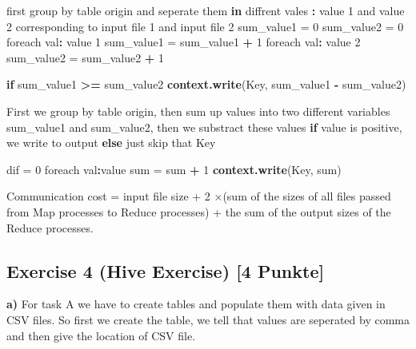 \documentclass[]{article}
\newenvironment{Shaded}{\begin{snugshade}}{\end{snugshade}}
\newcommand{\ControlFlowTok}[1]{\textcolor[rgb]{0.13,0.29,0.53}{\textbf{#1}}}
\newcommand{\DecValTok}[1]{\textcolor[rgb]{0.00,0.00,0.81}{#1}}
\newcommand{\KeywordTok}[1]{\textcolor[rgb]{0.13,0.29,0.53}{\textbf{#1}}}
\newcommand{\NormalTok}[1]{#1}
\newcommand{\OperatorTok}[1]{\textcolor[rgb]{0.81,0.36,0.00}{\textbf{#1}}}
\newcommand{\StringTok}[1]{\textcolor[rgb]{0.31,0.60,0.02}{#1}}
\begin{document}
\begin{Shaded}
\begin{Highlighting}[]
\NormalTok{first group by table origin and seperate them }\ControlFlowTok{in}\NormalTok{ diffrent vales }\OperatorTok{:}\StringTok{ }\NormalTok{value }\DecValTok{1}\NormalTok{ and }
\NormalTok{value }\DecValTok{2}\NormalTok{ corresponding to input file }\DecValTok{1}\NormalTok{ and input file }\DecValTok{2}
\NormalTok{sum_value1 =}\StringTok{ }\DecValTok{0}
\NormalTok{sum_value2 =}\StringTok{ }\DecValTok{0}
\NormalTok{foreach val}\OperatorTok{:}\StringTok{ }\NormalTok{value }\DecValTok{1}
\NormalTok{    sum_value1 =}\StringTok{ }\NormalTok{sum_value1 }\OperatorTok{+}\StringTok{ }\DecValTok{1}
\NormalTok{foreach val}\OperatorTok{:}\StringTok{ }\NormalTok{value }\DecValTok{2}
\NormalTok{    sum_value2 =}\StringTok{ }\NormalTok{sum_value2 }\OperatorTok{+}\StringTok{ }\DecValTok{1}

\ControlFlowTok{if}\NormalTok{ sum_value1 }\OperatorTok{>=}\StringTok{ }\NormalTok{sum_value2}
    \KeywordTok{context.write}\NormalTok{(Key, sum_value1 }\OperatorTok{-}\StringTok{ }\NormalTok{sum_value2)}
    
\NormalTok{First we group by table origin, then sum up values into two different variables sum_value1}
\NormalTok{and sum_value2, then we substract these values }\ControlFlowTok{if}\NormalTok{ value is positive, }
\NormalTok{we write to output }\ControlFlowTok{else}\NormalTok{ just skip that Key}

\NormalTok{dif =}\StringTok{ }\DecValTok{0}
\NormalTok{foreach val}\OperatorTok{:}\NormalTok{value }
\NormalTok{    sum =}\StringTok{ }\NormalTok{sum }\OperatorTok{+}\StringTok{ }\DecValTok{1}
\KeywordTok{context.write}\NormalTok{(Key, sum)}
\end{Highlighting}
\end{Shaded}

Communication cost = input file size + 2 ×(sum of the sizes of all files
passed from Map processes to Reduce processes) + the sum of the output
sizes of the Reduce processes.

\newpage

\hypertarget{exercise-4-hive-exercise-4-punkte}{%
\subsection{Exercise 4 (Hive Exercise) {[}4
Punkte{]}}\label{exercise-4-hive-exercise-4-punkte}}

\textbf{a)} For task A we have to create tables and populate them with
data given in CSV files. So first we create the table, we tell that
values are seperated by comma and then give the location of CSV file.
\end{document}
